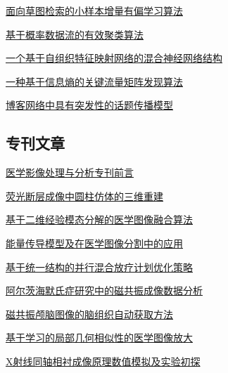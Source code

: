 \documentclass[a4paper]{article}
\begin{document}
\href{http://www.jos.org.cn/ch/reader/download_pdf.aspx?file_no=3274&year_id=2009&quarter_id=5&falg=1}{面向草图检索的小样本增量有偏学习算法}

\href{http://www.jos.org.cn/ch/reader/download_pdf.aspx?file_no=3303&year_id=2009&quarter_id=5&falg=1}{基于概率数据流的有效聚类算法}

\href{http://www.jos.org.cn/ch/reader/download_pdf.aspx?file_no=563&year_id=2009&quarter_id=5&falg=1}{一个基于自组织特征映射网络的混合神经网络结构}

\href{http://www.jos.org.cn/ch/reader/download_pdf.aspx?file_no=3308&year_id=2009&quarter_id=5&falg=1}{一种基于信息熵的关键流量矩阵发现算法}

\href{http://www.jos.org.cn/ch/reader/download_pdf.aspx?file_no=3512&year_id=2009&quarter_id=5&falg=1}{博客网络中具有突发性的话题传播模型}

\subsection{专刊文章}
\href{http://www.jos.org.cn/ch/reader/download_pdf.aspx?file_no=3616&year_id=2009&quarter_id=5&falg=1}{医学影像处理与分析专刊前言}

\href{http://www.jos.org.cn/ch/reader/download_pdf.aspx?file_no=3560&year_id=2009&quarter_id=5&falg=1}{荧光断层成像中圆柱仿体的三维重建}

\href{http://www.jos.org.cn/ch/reader/download_pdf.aspx?file_no=3542&year_id=2009&quarter_id=5&falg=1}{基于二维经验模态分解的医学图像融合算法}

\href{http://www.jos.org.cn/ch/reader/download_pdf.aspx?file_no=3547&year_id=2009&quarter_id=5&falg=1}{能量传导模型及在医学图像分割中的应用}

\href{http://www.jos.org.cn/ch/reader/download_pdf.aspx?file_no=3555&year_id=2009&quarter_id=5&falg=1}{基于统一结构的并行混合放疗计划优化策略}

\href{http://www.jos.org.cn/ch/reader/download_pdf.aspx?file_no=3556&year_id=2009&quarter_id=5&falg=1}{阿尔茨海默氏症研究中的磁共振成像数据分析}

\href{http://www.jos.org.cn/ch/reader/download_pdf.aspx?file_no=3577&year_id=2009&quarter_id=5&falg=1}{磁共振颅脑图像的脑组织自动获取方法}

\href{http://www.jos.org.cn/ch/reader/download_pdf.aspx?file_no=3546&year_id=2009&quarter_id=5&falg=1}{基于学习的局部几何相似性的医学图像放大}

\href{http://www.jos.org.cn/ch/reader/download_pdf.aspx?file_no=3604&year_id=2009&quarter_id=5&falg=1}{X射线同轴相衬成像原理数值模拟及实验初探}
\end{document}

